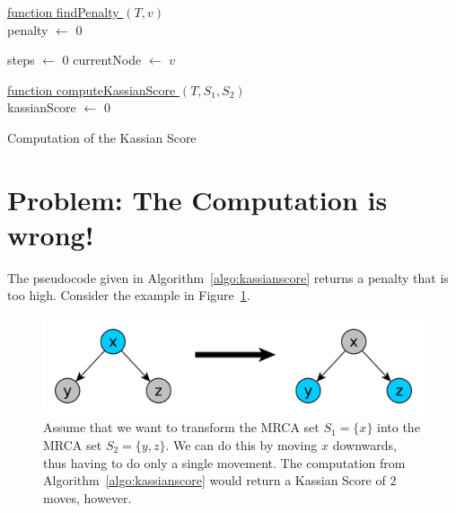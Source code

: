 \documentclass{llncs}
\begin{document}
\begin{algorithm}


\underline{function findPenalty $(T, v)$}\\
penalty $\gets$ $0$\;

steps $\gets$ $0$\;
currentNode $\gets$ $v$\;
\;


\underline{function computeKassianScore $(T, S_1, S_2)$}\\

kassianScore $\gets$ $0$\;




\caption{Computation of the Kassian Score}
\label{algo:kassianscore}
\end{algorithm}

\section{Problem: The Computation is wrong!}
The pseudocode given in Algorithm~\ref{algo:kassianscore} returns a penalty that is too high. Consider the example in Figure~\ref{fig:problem}.

\begin{figure}[H!]
\centering
\includegraphics[scale=0.5]{images/problem_with_kassian_score.pdf}
\caption{Assume that we want to transform the MRCA set $S_1 = \{x\}$ into the MRCA set $S_2 = \{y,z\}$. We can do this by moving $x$ downwards, thus having to do only a single movement. The computation from Algorithm~\ref{algo:kassianscore} would return a Kassian Score of $2$ moves, however.}
\label{fig:problem}
\end{figure}
\end{document}

